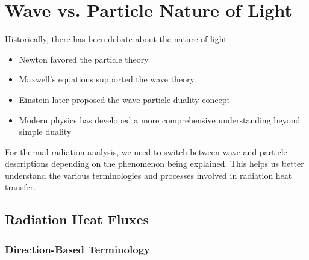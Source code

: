 \section*{Wave vs. Particle Nature of Light}

Historically, there has been debate about the nature of light:
\begin{itemize}
    \item Newton favored the particle theory
    \item Maxwell's equations supported the wave theory
    \item Einstein later proposed the wave-particle duality concept
    \item Modern physics has developed a more comprehensive understanding beyond simple duality
\end{itemize}

For thermal radiation analysis, we need to switch between wave and particle descriptions depending on the phenomenon being explained. This helps us better understand the various terminologies and processes involved in radiation heat transfer.

\subsection*{Radiation Heat Fluxes}

\subsubsection*{Direction-Based Terminology}

